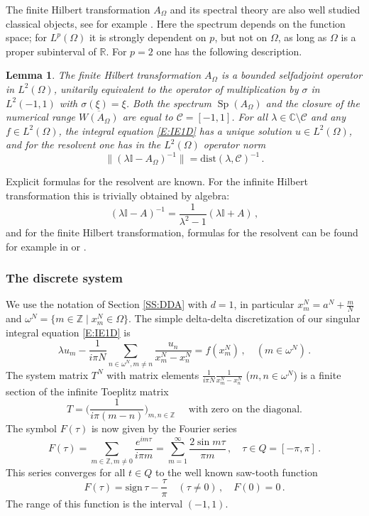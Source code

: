 \documentclass[12pt]{amsart}
\newtheorem{lemma}[theorem]{Lemma}
\theoremstyle{definition}
\theoremstyle{remark}
\numberwithin{equation}{section}
\newcommand\C{{\mathbb C}}
\newcommand\R{{\mathbb R}}
\newcommand\Z{{\mathbb Z}}
\newcommand\cC{{\mathcal{C}}}
\newcommand {\Id}{\mathbb I}
\newcommand{\dist}{\mathrm{dist}}
\newcommand{\sign}{\mathrm{sign}}
\newcommand{\Sp}{\mathop{\mathrm{Sp}}\nolimits}
\begin{document}
The finite Hilbert transformation $A_{\Omega}$ and its spectral theory are also well studied classical objects, see for example \cite{KoppelmanPincus1959}. Here the spectrum depends on the function space; for $L^{p}(\Omega)$ it is strongly dependent on $p$, but not on $\Omega$, as long as $\Omega$ is a proper subinterval of $\R$. For $p=2$ one has the following description.
\begin{lemma}
\label{L:SpAOmega}
The finite Hilbert transformation $A_{\Omega}$ is a bounded selfadjoint operator in $L^{2}(\Omega)$, unitarily equivalent to the operator of multiplication by $\sigma$ in $L^{2}(-1,1)$ with $\sigma(\xi)=\xi$.
Both the spectrum $\Sp(A_{\Omega})$ and the closure of the numerical range $\overline{W(A_{\Omega})}$ are equal to 
 $\cC=[-1,1]$.
 For all $\lambda\in\C\setminus\cC$ and any $f\in L^{2}(\Omega)$, the integral equation \eqref{E:IE1D} has a unique solution $u\in L^{2}(\Omega)$, and for the resolvent one has in the $L^{2}(\Omega)$ operator norm
\begin{equation}
\label{E:resAOmega1D}
 \|(\lambda\Id-A_{\Omega})^{-1}\| = \dist(\lambda,\cC)^{-1}\,.
\end{equation}
\end{lemma} 
Explicit formulas for the resolvent are known. For the infinite Hilbert transformation this is trivially obtained by algebra:
$$
 (\lambda\Id - A)^{-1} = 
 \frac1{\lambda^{2}-1} (\lambda\Id +  A)\,,
$$
and for the finite Hilbert transformation, formulas for the resolvent can be found for example in \cite{Soehngen1954} or \cite{Tricomi1957}.

\subsubsection{The discrete system}\label{SS:DA1D}
We use the notation of Section \ref{SS:DDA} with $d=1$, in particular $x^{N}_{m}=a^{N}+\frac{m}N$ and $\omega^{N} = \{m\in\Z \mid x^{N}_{m}\in \Omega\}$. The simple delta-delta discretization of our singular integral equation \eqref{E:IE1D} is
\begin{equation}
\label{E:DDA1D}
 \lambda u_{m} - \frac1{i\pi N}\sum_{n\in\omega^{N},m\ne n}\frac{u_{n}}{x^{N}_{m}-x^{N}_{n}}= f(x^{N}_{m}) \,,\quad (m\in\omega^{N})\,.
\end{equation}
The system matrix $T^{N}$ with matrix elements $\frac1{i\pi N}\frac1{x^{N}_{m}-x^{N}_{n}}$ ($m,n\in\omega^{N}$) is a finite section of the infinite Toeplitz matrix
$$
  T = \big( \frac1{i\pi(m-n)} \big)_{m,n\in\Z}\quad
  \mbox{ with zero on the diagonal.}
$$
The symbol $F(\tau)$ is now given by the Fourier series
\begin{equation}
\label{E:F1D}
 F(\tau) = \sum_{m\in\Z,m\ne0}\frac{e^{im\tau}}{i\pi m}
      =  \sum_{m=1}^{\infty} \frac{2\sin m\tau}{\pi m}\,,\quad \tau\in Q=[-\pi,\pi]\,.
\end{equation}
This series converges for all $t\in Q$ to the well known saw-tooth function
\begin{equation}
\label{E:sawtooth}
 F(\tau) = \sign \,\tau - \frac \tau\pi\quad (\tau\ne0)\,,\quad F(0)=0\,.
\end{equation}
The range of this function is the interval $(-1,1)$.
\end{document}
